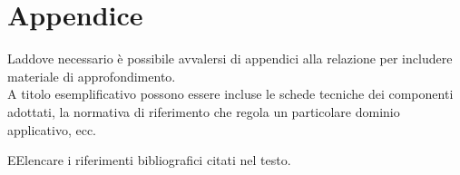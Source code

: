 \documentclass[12pt]{article}
\begin{document}

\appendix
{}
\section*{Appendice}
Laddove necessario è possibile avvalersi di appendici alla relazione per includere materiale di approfondimento.\\

A titolo esemplificativo possono essere incluse le schede tecniche dei componenti adottati, la normativa di riferimento che regola un particolare dominio applicativo, ecc.


\newpage


\begin{thebibliography}
EElencare i riferimenti bibliografici citati nel testo. 
\end{thebibliography}

\end{document}
